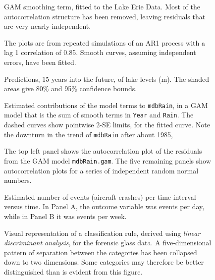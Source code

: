 \documentclass[12pt, a4paper,  BCOR=8.25mm, DIV=15]{scrartcl}\usepackage[]{graphicx}\usepackage[]{color}
\newcommand{\txtt}[1]{{\texttt{#1}}}
\begin{document}
\begin{figure}

\caption{GAM smoothing term, fitted to the Lake Erie Data.
    Most of the autocorrelation structure has been
    removed, leaving residuals that are very nearly independent.
  }\label{lh-smoothplot}
\end{figure}

\begin{figure}

\caption{The plots are from repeated simulations of an AR1 process with a
  lag 1 correlation of 0.85.  Smooth curves, assuming independent
  errors, have been fitted.}\label{fig:ar1fits}
\end{figure}

\begin{figure}

\caption{Predictions, 15 years into the future, of lake levels
  (m). The shaded areas give 80\% and 95\% confidence bounds.
}\label{Erie-fcastplot}
\end{figure}

\begin{figure}

  \caption{Estimated contributions of the model terms to
    \txtt{mdbRain}, in a GAM model that is the sum of smooth terms in
    \txtt{Year} and \txtt{Rain}. The dashed curves show pointwise
    2-SE limits, for the fitted curve.  Note the downturn
in the trend of \txtt{mdbRain} after about 1985,}\label{fig:mdbRainSM}
\end{figure}

\begin{figure}

\caption{The top left panel shows the autocorrelation plot of the
  residuals from the GAM model \txtt{mdbRain.gam}.  The five remaining
  panels show autocorrelation plots for a series of independent random
  normal numbers.}\label{fig:ar1sims}
\end{figure}

\begin{figure*}[h]

\caption{Estimated number of events (aircraft crashes) per time
  interval versus time.  In Panel A, the outcome variable was events
  per day, while in Panel B it was events per
  week.\label{fig:planeCrash}}
\end{figure*}

\begin{figure}

\caption{Visual representation of a classification rule, derived using
  {\em linear discriminant analysis}, for the forensic glass data.  A
  five-dimensional pattern of separation between the categories has
  been collapsed down to two dimensions.  Some categories may therefore
be better distinguished than is evident from this figure.
}
\label{fig:fgl}
\end{figure}
\end{document}
